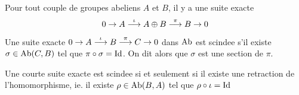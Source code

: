\documentclass[../main.tex]{subfiles}
\begin{document}
\begin{exemple}
Pour tout couple de groupes abeliens $A$ et $B$, il y a une suite exacte
\[ 
0\to A \overset{\iota}{\longrightarrow} A\oplus B \overset{\pi}{\longrightarrow} B \to 0
\]

\end{exemple}
\begin{defn}
	Une suite exacte $ 0 \to A \overset{\iota}{\longrightarrow} B \overset{\pi}{\longrightarrow} C \to 0$ dans $\operatorname{Ab}$ est scindee s'il existe $\sigma\in \operatorname{Ab}( C,B) $ tel que $\pi \circ\sigma = \operatorname{Id}$. On dit alors que $\sigma$ est une section de $\pi$.
\end{defn}
\begin{lemma}
Une courte suite exacte est scindee si et seulement si il existe une retraction de l'homomorphisme, ie. il existe $\rho \in \operatorname{Ab}( B,A) $ tel que $\rho \circ \iota= \operatorname{Id}$ 
\end{lemma}
\end{document}

